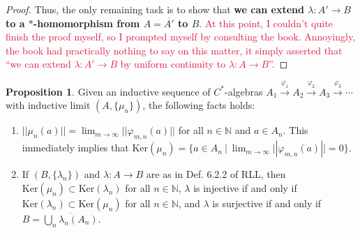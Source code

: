 \documentclass[aps,pra,showpacs,notitlepage,onecolumn,superscriptaddress,nofootinbib]{revtex4-1}
\newcommand{\pop}[1]{\textcolor{crimson}{#1}}
\theoremstyle{definition}
\newtheorem{proposition}{Proposition}[section]
\begin{document}
\begin{proof}
  \noindent Thus, the only remaining task is to show that \textbf{we can extend $\lambda : A' \rightarrow B$ to a $*$-homomorphism from $A = \overline{A'}$ to $B$}. \pop{At this point, I couldn't quite finish the proof myself,
    so I prompted myself by consulting the book. Annoyingly, the book had practically nothing to say on this matter, it simply asserted that ``we can extend $\lambda : A' \rightarrow B$ by uniform continuity to $\lambda : A \rightarrow B$''.}

\end{proof}

\begin{comment}
  Let $A$ and $B$ be $C^{*}$-algebras, let $A' \subset A$ be a sub-$*$ algebra which is dense in $A$, with the subspace topology inherited from the metric topology on $A$.
  Suppose $\varphi : A' \rightarrow B$ is a $*$-homomorphism. Then there exists a unique extension of $\varphi$ to a $*$-homomorphism $\Phi : A \rightarrow B$ with $\varphi(a) = \Phi(a)$
  for all $a \in A'$.

  To begin, let $\widetilde{A}$ and $\widetilde{B}$ denote the unitizations of $A$ and $B$. Clearly, $\widetilde{A'} = \{ (a, \alpha) \ | \ a \in A', \alpha \in \mathbb{C} \}$
  equipped with the algebraic operations of $\widetilde{A}$ is a sub-$*$ algebra of $\widetilde{A}$. Define $\widetilde{\varphi} : \widetilde{A'} \rightarrow \widetilde{B}$
  as $\widetilde{\varphi}(a, \alpha) = (\varphi(a), \alpha)$. It is easy to verify this is a $*$-homomorphism.
\end{comment}

\begin{proposition}
Given an inductive sequence of $C^{*}$-algebras $A_1 \xrightarrow{\varphi_1} A_2 \xrightarrow{\varphi_2} A_3 \xrightarrow{\varphi_3} \cdots$ with inductive limit $(A, \{\mu_n\})$, the following facts holds:
\begin{enumerate}
\item $||\mu_n(a)|| = \lim_{m \to \infty} ||\varphi_{m, n}(a)||$ for all $n \in \mathbb{N}$ and $a \in A_n$. This
  immediately implies that $\text{Ker}(\mu_n) = \{a \in A_n \ | \ \lim_{m \to \infty} ||\varphi_{m, n}(a)|| = 0\}$.
\item If $(B, \{\lambda_n\})$ and $\lambda : A \rightarrow B$ are as in Def. 6.2.2 of RLL, then $\text{Ker}(\mu_n) \subset \text{Ker}(\lambda_n)$
  for all $n \in \mathbb{N}$, $\lambda$ is injective if and only if $\text{Ker}(\lambda_n) \subset \text{Ker}(\mu_n)$ for all $n \in \mathbb{N}$,
  and $\lambda$ is surjective if and only if $B = \overline{\bigcup_{n} \lambda_n(A_n)}$.
\end{enumerate}
\end{proposition}
\end{document}

